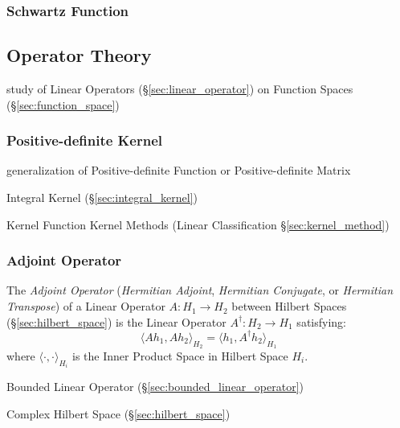 \subsubsection{Schwartz Function}\label{sec:schwartz_function}



\subsection{Operator Theory}\label{sec:operator_theory}

study of Linear Operators (\S\ref{sec:linear_operator}) on Function Spaces
(\S\ref{sec:function_space})



\subsubsection{Positive-definite Kernel}\label{sec:pd_kernel}

generalization of Positive-definite Function or Positive-definite Matrix

\fist Integral Kernel (\S\ref{sec:integral_kernel})

Kernel Function \fist Kernel Methods (Linear Classification
\S\ref{sec:kernel_method})



\subsubsection{Adjoint Operator}\label{sec:adjoint_operator}

The \emph{Adjoint Operator} (\emph{Hermitian Adjoint}, \emph{Hermitian
  Conjugate}, or \emph{Hermitian Transpose}) of a Linear Operator $A : H_1
\rightarrow H_2$ between Hilbert Spaces (\S\ref{sec:hilbert_space}) is the
Linear Operator $A^\dag : H_2 \rightarrow H_1$ satisfying:
\[
  \langle{Ah_1,Ah_2}\rangle_{H_2} = \langle{h_1,A^{\dag}h_2}\rangle_{H_1}
\]
where $\langle\cdot,\cdot\rangle_{H_i}$ is the Inner Product Space in Hilbert
Space $H_i$.


Bounded Linear Operator (\S\ref{sec:bounded_linear_operator})

Complex Hilbert Space (\S\ref{sec:hilbert_space})



